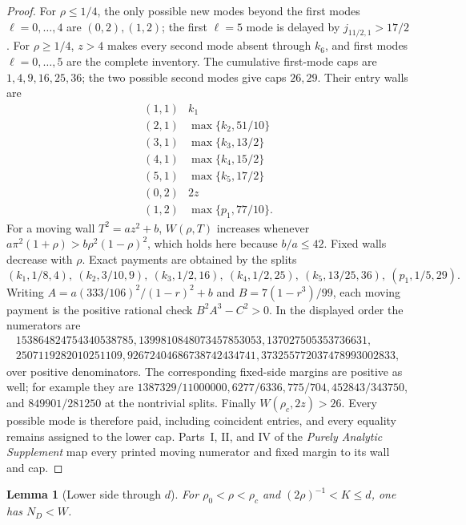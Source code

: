\documentclass[11pt]{article}
\numberwithin{equation}{section}
\newtheorem{lemma}[theorem]{Lemma}
\theoremstyle{definition}
\theoremstyle{remark}
\begin{document}
\begin{proof}
For \(\rho\leq1/4\), the only possible new modes beyond the first modes
\(\ell=0,\ldots,4\) are \((0,2),(1,2)\); the first \(\ell=5\) mode is
delayed by \(j_{11/2,1}>17/2\).  For \(\rho\geq1/4\),
\(z>4\) makes every second mode absent through \(k_6\), and first modes
\(\ell=0,\ldots,5\) are the complete inventory.  The cumulative first-mode
caps are \(1,4,9,16,25,36\); the two possible second modes give caps
\(26,29\).  Their entry walls are
\[
\begin{array}{c|c}
(1,1)&k_1\\
(2,1)&\max\{k_2,51/10\}\\
(3,1)&\max\{k_3,13/2\}\\
(4,1)&\max\{k_4,15/2\}\\
(5,1)&\max\{k_5,17/2\}\\
(0,2)&2z\\
(1,2)&\max\{p_1,77/10\}.
\end{array}
\]
For a moving wall \(T^2=az^2+b\), \(W(\rho,T)\) increases whenever
\(a\pi^2(1+\rho)>b\rho^2(1-\rho)^2\), which holds here because
\(b/a\leq42\).  Fixed walls decrease with \(\rho\).  Exact payments are
obtained by the splits
\[
 (k_1,1/8,4),\ (k_2,3/10,9),\ (k_3,1/2,16),\
 (k_4,1/2,25),\ (k_5,13/25,36),\ (p_1,1/5,29).
\]
Writing
\(A=a(333/106)^2/(1-r)^2+b\) and
\(B=7(1-r^3)/99\), each moving payment is the positive rational check
\(B^2A^3-C^2>0\).  In the displayed order the numerators are
\[
\begin{gathered}
153864824754340538785,
1399810848073457853053,
137027505353736631,\\
2507119282010251109,
92672404686738742434741,
373255772037478993002833,
\end{gathered}
\]
over positive denominators.  The corresponding fixed-side margins are
positive as well; for example they are
\(1387329/11000000,6277/6336,775/704,452843/343750\), and
\(849901/281250\) at the nontrivial splits.  Finally
\(W(\rho_c,2z)>26\).  Every possible mode is therefore paid, including
coincident entries, and every equality remains assigned to the lower cap.
 Parts~I, II, and IV of the \emph{Purely Analytic Supplement} map every
 printed moving numerator and fixed margin to its wall and cap.
\end{proof}

\begin{lemma}[Lower side through \(d\)]
\label{cm:lem-lower-d}
For \(\rho_0<\rho<\rho_c\) and
\((2\rho)^{-1}<K\leq d\), one has \(N_D<W\).
\end{lemma}
\end{document}
